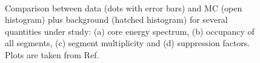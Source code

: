 \begin{figure}[htbp]
\centering
{}%
\\
%
%
\caption{Comparison between data (dots with error bars) and MC (open histogram) plus background (hatched histogram) for several quantities under study: (a) core energy spectrum, (b) occupancy of all segments, (c) segment multiplicity and (d) suppression factors. Plots are taken from Ref.~\cite{Pid07}}
\label{fig:ph:mc}
\end{figure}

